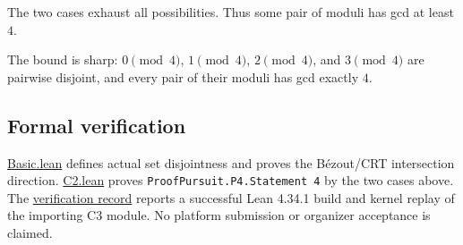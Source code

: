 \documentclass[11pt,a4paper]{article}
\begin{document}
The two cases exhaust all possibilities. Thus some pair of moduli has gcd at least \(4\).

The bound is sharp: \(0\pmod4\), \(1\pmod4\), \(2\pmod4\), and \(3\pmod4\) are pairwise disjoint, and every pair of their moduli has gcd exactly \(4\).

\subsection{Formal verification}\label{formal-verification}

\href{https://github.com/mpelteshki/climbing-to-the-frontier/blob/ed55f76eb8c558825bb629fd2cd8dbf46e5f1314/cagent/p4/lean/ProofPursuit/P4/Basic.lean}{Basic.lean} defines actual set disjointness and proves the B\'{e}zout/CRT intersection direction. \href{https://github.com/mpelteshki/climbing-to-the-frontier/blob/ed55f76eb8c558825bb629fd2cd8dbf46e5f1314/cagent/p4/lean/ProofPursuit/P4/C2.lean}{C2.lean} proves \texttt{ProofPursuit.P4.Statement\ 4} by the two cases above. The \href{https://github.com/mpelteshki/climbing-to-the-frontier/blob/ed55f76eb8c558825bb629fd2cd8dbf46e5f1314/cagent/p4/verification.md}{verification record} reports a successful Lean 4.34.1 build and kernel replay of the importing C3 module. No platform submission or organizer acceptance is claimed.
\end{document}
